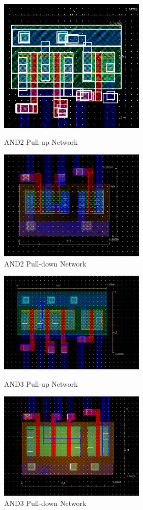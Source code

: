 \documentclass{article}
\begin{document}
\begin{figure}[ht]
\centering
\parbox{8cm}{
\includegraphics[width=7cm]{final_cells/AND2_PMOS}
  \caption{AND2 Pull-up Network}
\label{fig:AND2_pmos}}
\qquad
\begin{minipage}{7cm}
\includegraphics[width=7cm]{final_cells/AND2_NMOS}
  \caption{AND2 Pull-down Network}
\label{fig:AND2_nmos}
\end{minipage}
\end{figure}

\begin{figure}[ht]
\centering
\parbox{8cm}{
\includegraphics[width=7cm]{final_cells/AND3_PMOS}
  \caption{AND3 Pull-up Network}
\label{fig:AND3_pmos}}
\qquad
\begin{minipage}{7cm}
\includegraphics[width=7cm]{final_cells/AND3_NMOS}
  \caption{AND3 Pull-down Network}
\label{fig:AND3_nmos}
\end{minipage}
\end{figure}
\end{document}
